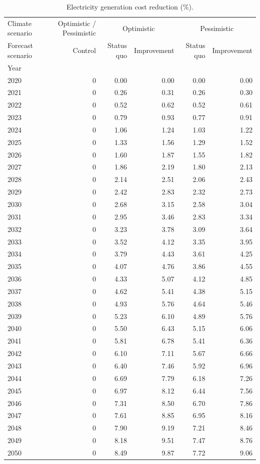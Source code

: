 \begin{table}
\caption{Electricity generation
cost reduction (\%).}
\label{tab:hydropower_impact_channel_KHM}
\centering
\begin{tabular}{lrrrrr}
\toprule
Climate scenario & Optimistic / Pessimistic & \multicolumn{2}{c}{Optimistic} & \multicolumn{2}{c}{Pessimistic} \\
Forecast scenario & Control & Status quo & Improvement & Status quo & Improvement \\
Year &  &  &  &  &  \\
\midrule
2020 & 0 & 0.00 & 0.00 & 0.00 & 0.00 \\
2021 & 0 & 0.26 & 0.31 & 0.26 & 0.30 \\
2022 & 0 & 0.52 & 0.62 & 0.52 & 0.61 \\
2023 & 0 & 0.79 & 0.93 & 0.77 & 0.91 \\
2024 & 0 & 1.06 & 1.24 & 1.03 & 1.22 \\
2025 & 0 & 1.33 & 1.56 & 1.29 & 1.52 \\
2026 & 0 & 1.60 & 1.87 & 1.55 & 1.82 \\
2027 & 0 & 1.86 & 2.19 & 1.80 & 2.13 \\
2028 & 0 & 2.14 & 2.51 & 2.06 & 2.43 \\
2029 & 0 & 2.42 & 2.83 & 2.32 & 2.73 \\
2030 & 0 & 2.68 & 3.15 & 2.58 & 3.04 \\
2031 & 0 & 2.95 & 3.46 & 2.83 & 3.34 \\
2032 & 0 & 3.23 & 3.78 & 3.09 & 3.64 \\
2033 & 0 & 3.52 & 4.12 & 3.35 & 3.95 \\
2034 & 0 & 3.79 & 4.43 & 3.61 & 4.25 \\
2035 & 0 & 4.07 & 4.76 & 3.86 & 4.55 \\
2036 & 0 & 4.33 & 5.07 & 4.12 & 4.85 \\
2037 & 0 & 4.62 & 5.41 & 4.38 & 5.15 \\
2038 & 0 & 4.93 & 5.76 & 4.64 & 5.46 \\
2039 & 0 & 5.23 & 6.10 & 4.89 & 5.76 \\
2040 & 0 & 5.50 & 6.43 & 5.15 & 6.06 \\
2041 & 0 & 5.81 & 6.78 & 5.41 & 6.36 \\
2042 & 0 & 6.10 & 7.11 & 5.67 & 6.66 \\
2043 & 0 & 6.40 & 7.46 & 5.92 & 6.96 \\
2044 & 0 & 6.69 & 7.79 & 6.18 & 7.26 \\
2045 & 0 & 6.97 & 8.12 & 6.44 & 7.56 \\
2046 & 0 & 7.31 & 8.50 & 6.70 & 7.86 \\
2047 & 0 & 7.61 & 8.85 & 6.95 & 8.16 \\
2048 & 0 & 7.90 & 9.19 & 7.21 & 8.46 \\
2049 & 0 & 8.18 & 9.51 & 7.47 & 8.76 \\
2050 & 0 & 8.49 & 9.87 & 7.72 & 9.06 \\
\bottomrule
\end{tabular}
\end{table}
